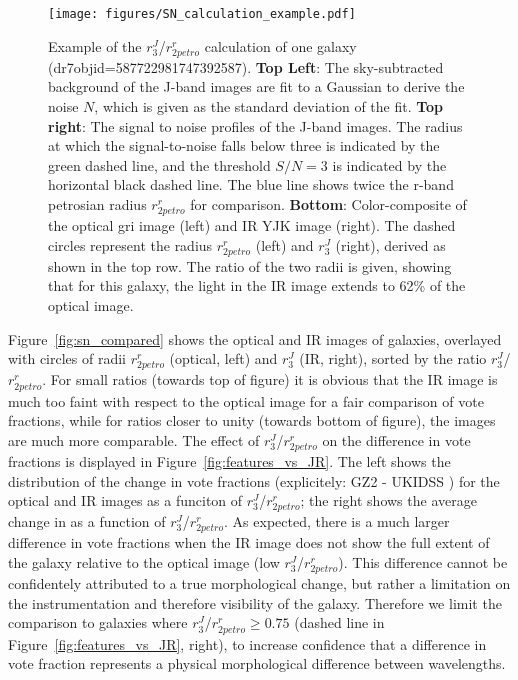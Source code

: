 \begin{figure}
\centering
\texttt{[image: figures/SN\_calculation\_example.pdf]}
\caption{Example of the $r^{J}_{3}$/$r^{r}_{2petro}$ calculation of one galaxy (dr7objid=587722981747392587). \textbf{Top Left}: The sky-subtracted background of the J-band images are fit to a Gaussian to derive the noise $N$, which is given as the standard deviation of the fit. \textbf{Top right}: The signal to noise profiles of the J-band images. The radius at which the signal-to-noise falls below three is indicated by the green dashed line, and the threshold $S/N=3$ is indicated by the horizontal black dashed line. The blue line shows twice the r-band petrosian radius $r^{r}_{2petro}$ for comparison. \textbf{Bottom}: Color-composite of the optical gri image (left) and IR YJK image (right). The dashed circles represent the radius $r^{r}_{2petro}$ (left) and $r^{J}_{3}$ (right), derived as shown in the top row. The ratio of the two radii is given, showing that for this galaxy, the light in the IR image extends to 62\% of the optical image.}
\label{fig:SN_calculation}
\end{figure}

Figure~\ref{fig:sn_compared} shows the optical and IR images of galaxies, overlayed with circles of radii $r^{r}_{2petro}$ (optical, left) and $r^{J}_{3}$ (IR, right), sorted by the ratio $r^{J}_{3}$/$r^{r}_{2petro}$. For small ratios (towards top of figure) it is obvious that the IR image is much too faint with respect to the optical image for a fair comparison of vote fractions, while for ratios closer to unity (towards bottom of figure), the images are much more comparable. The effect of $r^{J}_{3}$/$r^{r}_{2petro}$ on the difference in vote fractions is displayed in Figure~\ref{fig:features_vs_JR}. The left shows the distribution of the change in \ffeatures{} vote fractions (explicitely: GZ2 \ffeatures{} - UKIDSS \ffeatures{}) for the optical and IR images as a funciton of $r^{J}_{3}$/$r^{r}_{2petro}$; the right shows the average change in \ffeatures{} as a function of $r^{J}_{3}$/$r^{r}_{2petro}$. As expected, there is a much larger difference in vote fractions when the IR image does not show the full extent of the galaxy relative to the optical image (low $r^{J}_{3}$/$r^{r}_{2petro}$). This difference cannot be confidentely attributed to a true morphological change, but rather a limitation on the instrumentation and therefore visibility of the galaxy. Therefore we limit the comparison to galaxies where $r^{J}_{3}$/$r^{r}_{2petro} \ge 0.75$ (dashed line in Figure~\ref{fig:features_vs_JR}, right), to increase confidence that a difference in vote fraction represents a physical morphological difference between wavelengths.   


